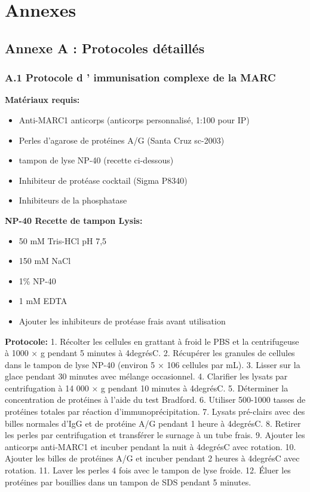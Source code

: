 \documentclass[11pt,a4paper]{article}
\begin{document}

\newpage

\section*{Annexes}

\subsection*{Annexe A : Protocoles détaillés}

\subsubsection*{A.1 Protocole d ' immunisation complexe de la MARC}

\textbf{Matériaux requis:}
\begin{itemize}
\item Anti-MARC1 anticorps (anticorps personnalisé, 1:100 pour IP)
\item Perles d'agarose de protéines A/G (Santa Cruz sc-2003)
\item tampon de lyse NP-40 (recette ci-dessous)
\item Inhibiteur de protéase cocktail (Sigma P8340)
\item Inhibiteurs de la phosphatase
\end{itemize}

\textbf{NP-40 Recette de tampon Lysis:}
\begin{itemize}
\item 50 mM Tris-HCl pH 7,5
\item 150 mM NaCl
\item 1\% NP-40
\item 1 mM EDTA
\item Ajouter les inhibiteurs de protéase frais avant utilisation
\end{itemize}

\textbf{Protocole:}
1. Récolter les cellules en grattant à froid le PBS et la centrifugeuse à 1000 × g pendant 5 minutes à 4degrésC. 2. Récupérer les granules de cellules dans le tampon de lyse NP-40 (environ 5 × 106 cellules par mL). 3. Lisser sur la glace pendant 30 minutes avec mélange occasionnel. 4. Clarifier les lysats par centrifugation à 14 000 × g pendant 10 minutes à 4degrésC. 5. Déterminer la concentration de protéines à l'aide du test Bradford. 6. Utiliser 500-1000 tasses de protéines totales par réaction d'immunoprécipitation. 7. Lysats pré-clairs avec des billes normales d'IgG et de protéine A/G pendant 1 heure à 4degrésC. 8. Retirer les perles par centrifugation et transférer le surnage à un tube frais. 9. Ajouter les anticorps anti-MARC1 et incuber pendant la nuit à 4degrésC avec rotation. 10. Ajouter les billes de protéines A/G et incuber pendant 2 heures à 4degrésC avec rotation. 11. Laver les perles 4 fois avec le tampon de lyse froide. 12. Éluer les protéines par bouillies dans un tampon de SDS pendant 5 minutes.
\end{document}
